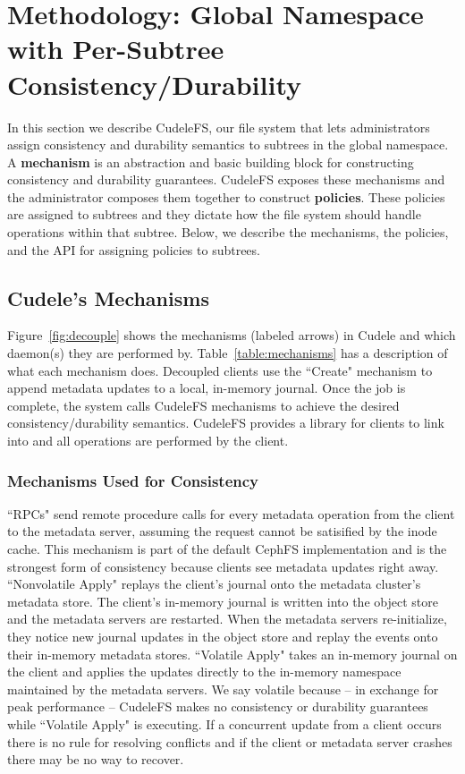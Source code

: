 \section{Methodology: Global Namespace with Per-Subtree Consistency/Durability}
\label{sec:methodology-decoupled-namespaces}

In this section we describe CudeleFS, our file system that lets administrators
assign consistency and durability semantics to subtrees in the global
namespace. A \textbf{mechanism} is an abstraction and basic building block for
constructing consistency and durability guarantees. CudeleFS exposes these
mechanisms and the administrator composes them together to construct
\textbf{policies}. These policies are assigned to subtrees and they dictate how
the file system should handle operations within that subtree.  Below, we
describe the mechanisms, the policies, and the API for assigning policies to
subtrees.

\subsection{Cudele's Mechanisms}
\label{sec:cudeles-mechanisms}

Figure~\ref{fig:decouple} shows the mechanisms (labeled arrows) in Cudele and
which daemon(s) they are performed by.  Table~\ref{table:mechanisms} has a
description of what each mechanism does.  Decoupled clients use the ``Create"
mechanism to append metadata updates to a local, in-memory journal. Once the
job is complete, the system calls CudeleFS mechanisms to achieve the desired
consistency/durability semantics.  CudeleFS provides a library for clients to
link into and all operations are performed by the client.  

\subsubsection{Mechanisms Used for Consistency} ``RPCs" send remote procedure
calls for every metadata operation from the client to the metadata server,
assuming the request cannot be satisified by the inode cache. This mechanism is
part of the default CephFS implementation and is the strongest form of
consistency because clients see metadata updates right away.  ``Nonvolatile
Apply" replays the client's journal onto the metadata cluster's metadata store.
The client's in-memory journal is written into the object store and the
metadata servers are restarted. When the metadata servers re-initialize, they
notice new journal updates in the object store and replay the events onto their
in-memory metadata stores.  ``Volatile Apply" takes an in-memory journal on the
client and applies the updates directly to the in-memory namespace maintained
by the metadata servers. We say volatile because -- in exchange for peak
performance -- CudeleFS makes no consistency or durability guarantees while
``Volatile Apply" is executing.  If a concurrent update from a client occurs
there is no rule for resolving conflicts and if the client or metadata server
crashes there may be no way to recover.

